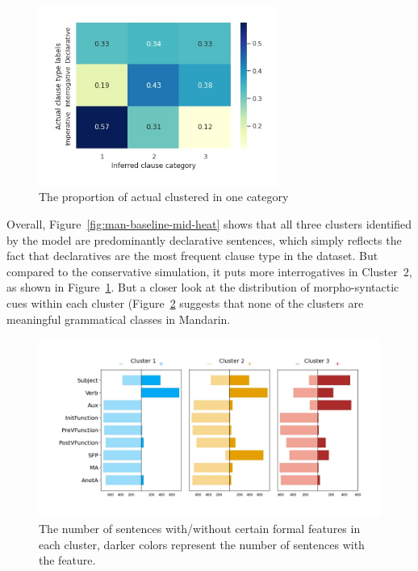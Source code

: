 \begin{figure}[H]
    \centering
    \includegraphics[width=0.7\textwidth]{figures/man-baseline-mid-heatrev.jpg}
    \caption{The proportion of actual \diis{} clustered in one category}
    \label{fig:man-baseline-mid-heatrev}
\end{figure}

Overall, Figure~\ref{fig:man-baseline-mid-heat} shows that all three clusters identified by the \dlearnerabbr{} model are predominantly declarative sentences, which simply reflects the fact that declaratives are the most frequent clause type in the dataset. But compared to the conservative simulation, it puts more interrogatives in Cluster~$2$, as shown in Figure~\ref{fig:man-baseline-mid-heatrev}. But a closer look at the distribution of morpho-syntactic cues within each cluster (Figure~\ref{fig:man-baseline-syncluster} suggests that none of the clusters are meaningful grammatical classes in Mandarin. %

\begin{figure}[H]
    \centering
    \includegraphics[width=1\textwidth]{figures/man-baseline-mid-syncluster.jpg}
    \caption{The number of sentences with/without certain formal features in each cluster, darker colors represent the number of sentences with the feature. }
    \label{fig:man-baseline-syncluster}
\end{figure}


